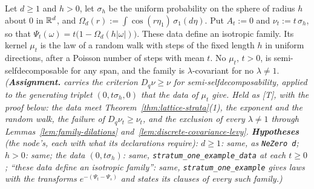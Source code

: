 \begin{proposition}
\label{prop:stratum-one-example}
\leanok
Let $d \ge 1$ and $h > 0$, let $\sigma_h$ be the uniform probability on the sphere of radius $h$ about
$0$ in $\mathbb{R}^d$, and $\Omega_d(r) := \int\cos(r\eta_1)\,\sigma_1(d\eta)$. Put $A_t := 0$ and
$\nu_t := t\,\sigma_h$, so that $\Psi_t(\omega) = t\bigl(1 - \Omega_d(h|\omega|)\bigr)$. These data
define an isotropic family. Its kernel $\mu_t$ is the law of a random walk with steps of the fixed
length $h$ in uniform directions, after a Poisson number of steps with mean $t$. No $\mu_t$, $t > 0$,
is semi-selfdecomposable for any span, and the family is $\lambda$-covariant for no $\lambda \ne 1$.
\statusA\quad{}\quad\emph{(\textbf{Assignment.}  carries the criterion
$D_q\nu \ge \nu$ for semi-selfdecomposability, applied to the generating triplet $(0, t\sigma_h, 0)$
that the data of $\mu_t$ give. Held as [T], with the proof below: the data meet
Theorem~\ref{thm:lattice-strata}(1), the exponent and the random walk, the failure of
$D_q\nu_t \ge \nu_t$, and the exclusion of every $\lambda \ne 1$ through
Lemmas~\ref{lem:family-dilations} and~\ref{lem:discrete-covariance-levy}.
\textbf{Hypotheses} (the node's, each with what its declarations require): $d \ge 1$: same, as
\texttt{NeZero d}; $h > 0$: same; the data $(0, t\sigma_h)$: same, \texttt{stratum\_one\_example\_data}
at each $t \ge 0$; ``these data define an isotropic family'': same, \texttt{stratum\_one\_example}
gives laws with the transforms $e^{-(\Psi_t - \Psi_s)}$ and states its clauses of every such family.)}
\end{proposition}


